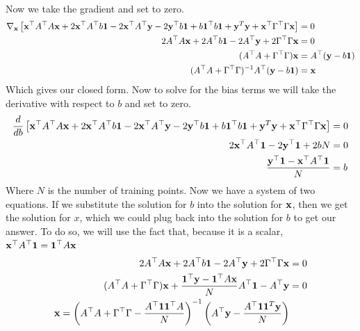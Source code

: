 \documentclass[12pt,letterpaper,fleqn]{hmcpset}
\begin{document}
\begin{enumerate}[(a)]
\begin{align*}
        \end{align*}
        Now we take the gradient and set to zero.
        \begin{align*}
            \nabla_{\bf x} \left[ {\bf x}^\top A^\top A {\bf x} + 2 {\bf x}^\top A^\top b{\bf 1} - 2 {\bf x}^\top A^\top {\bf y} -2 {\bf y}^\top b{\bf 1} + b{\bf 1}^\top b{\bf 1} + {\bf y}^T {\bf y} + {\bf x}^\top \Gamma^\top \Gamma {\bf x} \right] &= 0\\
            2A^\top A {\bf x} + 2 A^\top b{\bf 1} - 2 A^\top {\bf y} + 2\Gamma^\top \Gamma {\bf x} &= 0 \\
            (A^\top A + \Gamma^\top \Gamma){\bf x} &= A^\top ({\bf y}  - b{\bf 1}) \\
            (A^\top A + \Gamma^\top \Gamma)^{-1}A^\top ({\bf y}  - b{\bf 1}) &= {\bf x}
        \end{align*}
        Which gives our closed form. Now to solve for the bias terms we will take the derivative with respect to $b$ and set to zero.
        \begin{align*}
            \frac{d}{db} \left[  {\bf x}^\top A^\top A {\bf x} + 2 {\bf x}^\top A^\top b{\bf 1} - 2 {\bf x}^\top A^\top {\bf y} -2 {\bf y}^\top b{\bf 1} + b{\bf 1}^\top b{\bf 1} + {\bf y}^T {\bf y} + {\bf x}^\top \Gamma^\top \Gamma {\bf x} \right] &= 0\\
            2 {\bf x}^\top A^\top{\bf 1} -2{\bf y}^\top{\bf 1} +2 b N &= 0 \\
             \frac{{\bf y}^\top{\bf 1} - {\bf x}^\top A^\top{\bf 1}}{N} &= b
        \end{align*}
        Where $N$ is the number of training points. Now we have a system of two equations. If we substitute the solution for $b$ into the solution for ${\bf x}$, then we get the solution for $x$, which we could plug back into the solution for $b$ to get our answer. To do so, we will use the fact that, because it is a scalar, ${\bf x}^\top A^\top{\bf 1} = {\bf 1}^\top A {\bf x}$
        \begin{align*}
            2A^\top A {\bf x} + 2 A^\top b{\bf 1} - 2 A^\top {\bf y} + 2\Gamma^\top \Gamma {\bf x} &= 0 \\
            (A^\top A + \Gamma^\top \Gamma){\bf x} + \frac{{\bf 1}^\top {\bf y} - {\bf 1}^\top A {\bf x}}{N}A^\top {\bf 1} - A^\top {\bf y}  &= 0\\
            {\bf x} =  \left(A^\top A + \Gamma^\top \Gamma -\frac{A^\top{\bf 1}{\bf 1}^\top A}{N}\right)^{-1} \left(A^\top {\bf y} - \frac{A^\top {\bf 1} {\bf 1}^T {\bf y}}{N} \right)
        \end{align*}


\end{enumerate}
\end{document}
